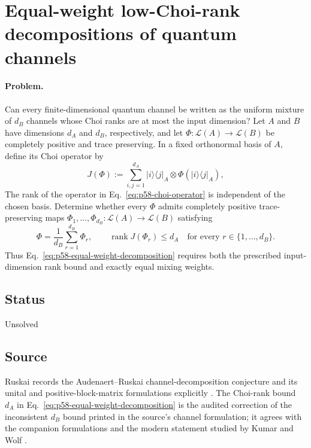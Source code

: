 \section{Equal-weight low-Choi-rank decompositions of quantum channels}
\label{sec:problem-58}

\paragraph{Problem.}
Can every finite-dimensional quantum channel be written as the uniform
mixture of $d_B$ channels whose Choi ranks are at most the input dimension?
Let $A$ and $B$ have dimensions $d_A$ and $d_B$, respectively, and let
$\Phi:\mathcal L(A)\to\mathcal L(B)$ be completely positive and trace
preserving.  In a fixed orthonormal basis of $A$, define its Choi operator by
\begin{equation}
  J(\Phi)
  :=\sum_{i,j=1}^{d_A}
      \lvert i\rangle\!\langle j\rvert_A\otimes
      \Phi\!\left(\lvert i\rangle\!\langle j\rvert_A\right),
  \label{eq:p58-choi-operator}
\end{equation}
The rank of the operator in Eq.~\eqref{eq:p58-choi-operator} is independent
of the chosen basis.  Determine whether every $\Phi$ admits completely
positive trace-preserving maps
$\Phi_1,\ldots,\Phi_{d_B}:\mathcal L(A)\to\mathcal L(B)$ satisfying
\begin{equation}
  \Phi=\frac1{d_B}\sum_{r=1}^{d_B}\Phi_r,
  \qquad
  \operatorname{rank}J(\Phi_r)\leq d_A
  \quad\text{for every }r\in\{1,\ldots,d_B\}.
  \label{eq:p58-equal-weight-decomposition}
\end{equation}
Thus Eq.~\eqref{eq:p58-equal-weight-decomposition} requires both the
prescribed input-dimension rank bound and exactly equal mixing weights.

\subsection*{Status}

Unsolved

\subsection*{Source}

Ruskai records the Audenaert--Ruskai channel-decomposition conjecture and its
unital and positive-block-matrix formulations explicitly
.  The Choi-rank bound $d_A$ in
Eq.~\eqref{eq:p58-equal-weight-decomposition} is the audited correction of
the inconsistent $d_B$ bound printed in the source's channel formulation;
it agrees with the companion formulations and the modern statement studied
by Kumar and Wolf .

